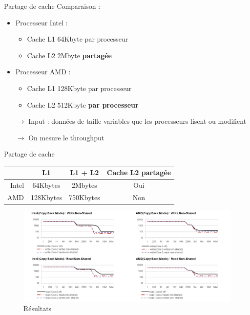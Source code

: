 \documentclass{beamer}
\begin{document}
\begin{frame}{Partage de cache}
	Comparaison :\pause
	\begin{itemize}
		\item Processeur Intel :
			\begin{itemize}
				\item Cache L1 64Kbyte par processeur
				\item Cache L2 2Mbyte \textbf{partagée}
			\end{itemize}\pause
		\item Processeur AMD :
			\begin{itemize}
				\item Cache L1 128Kbyte par processeur
				\item Cache L2 512Kbyte \textbf{par processeur}
			\end{itemize}\pause
	\end{itemize}
	\begin{itemize}
		\item[$\rightarrow$] Input : données de taille variables que les processeurs
			lisent ou modifient
		\item[$\rightarrow$] On mesure le throughput
	\end{itemize}
	\medskip
\end{frame}

\begin{frame}{Partage de cache}

	\begin{center}
		\begingroup
		\footnotesize
		\begin{tabular}{r|ccc}
		& L1 & L1 + L2 & Cache L2 partagée \\
		\hline
			Intel & 64Kbytes & 2Mbytes & Oui \\
			AMD & 128Kbytes & 750Kbytes & Non \\
		\end{tabular}
		\endgroup
	\end{center}

	\begin{figure}
		\centering
		\includegraphics[width=0.9\paperwidth]{results_cache_sharing.png}
		\caption{Résultats \cite{Fuch}}
		\label{fig:results_cache_sharing}
	\end{figure}	
\end{frame}
\end{document}
